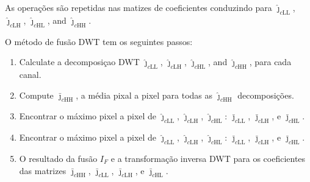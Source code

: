 As operações são repetidas nas matizes de coeficientes conduzindo para $\bm{\widehat\jmath}_{c\text{LL}}$, $\bm{\widehat\jmath}_{c\text{LH}}$, $\bm{\widehat\jmath}_{c\text{HL}}$, and $\bm{\widehat\jmath}_{c\text{HH}}$.

O método de fusão DWT tem os seguintes passos:
\begin{enumerate}
\item Calculate a decomposiçao DWT $\bm{\widehat\jmath}_{c\text{LL}}$, $\bm{\widehat\jmath}_{c\text{LH}}$, $\bm{\widehat\jmath}_{c\text{HL}}$, and $\bm{\widehat\jmath}_{c\text{HH}}$, para cada canal.
\item Compute $\bm{\bar\jmath}_{c\text{HH}}$, a média pixal a pixel para todas as $\bm{\widehat\jmath}_{c\text{HH}}$ decomposições.
\item Encontrar o máximo pixel a pixel de $\bm{\widehat\jmath}_{c\text{LL}}$, $\bm{\widehat\jmath}_{c\text{LH}}$, $\bm{\widehat\jmath}_{c\text{HL}}$: $\bm{\bar\jmath}_{c\text{LL}}$, $\bm{\bar\jmath}_{c\text{LH}}$, e $\bm{\bar\jmath}_{c\text{HL}}$.
\item Encontrar o máximo pixel a pixel de $\bm{\widehat\jmath}_{c\text{LL}}$, $\bm{\widehat\jmath}_{c\text{LH}}$, $\bm{\widehat\jmath}_{c\text{HL}}$: $\bm{\bar\jmath}_{c\text{LL}}$, $\bm{\bar\jmath}_{c\text{LH}}$, e $\bm{\bar\jmath}_{c\text{HL}}$.
\item O resultado da fusão $I_F$ e a transformação inversa DWT para os coeficientes das matrizes $\bm{\bar\jmath}_{c\text{HH}}$, $\bm{\bar\jmath}_{c\text{LL}}$, $\bm{\bar\jmath}_{c\text{LH}}$, e $\bm{\bar\jmath}_{c\text{HL}}$.
\end{enumerate}

